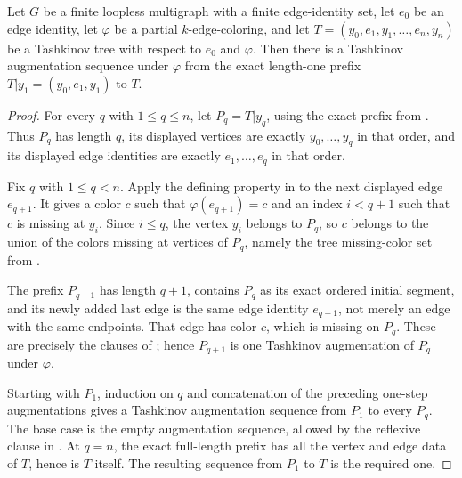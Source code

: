 \begin{lemma}
Let \(G\) be a finite loopless multigraph with a finite edge-identity set,
let \(e_0\) be an edge identity, let \(\varphi\) be a partial \(k\)-edge-coloring,
and let \(T=(y_0,e_1,y_1,\ldots,e_n,y_n)\) be a Tashkinov tree with
respect to \(e_0\) and \(\varphi\).  Then there is a Tashkinov augmentation
sequence under \(\varphi\) from the exact length-one prefix
\(T|y_1=(y_0,e_1,y_1)\) to \(T\).
\end{lemma}
\begin{proof}
For every \(q\) with \(1\leq q\leq n\), let \(P_q=T|y_q\), using the
exact prefix from .  Thus \(P_q\) has length
\(q\), its displayed vertices are exactly \(y_0,\ldots,y_q\) in that
order, and its displayed edge identities are exactly
\(e_1,\ldots,e_q\) in that order.

Fix \(q\) with \(1\leq q<n\).  Apply the defining property in
 to the next displayed edge \(e_{q+1}\).  It gives
a color \(c\) such that \(\varphi(e_{q+1})=c\) and an index
\(i<q+1\) such that \(c\) is missing at \(y_i\).  Since
\(i\leq q\), the vertex \(y_i\) belongs to \(P_q\), so \(c\) belongs to
the union of the colors missing at vertices of \(P_q\), namely the tree
missing-color set from .

The prefix \(P_{q+1}\) has length \(q+1\), contains \(P_q\) as its exact
ordered initial segment, and its newly added last edge is the same edge
identity \(e_{q+1}\), not merely an edge with the same endpoints.  That
edge has color \(c\), which is missing on \(P_q\).  These are precisely
the clauses of ; hence \(P_{q+1}\) is one
Tashkinov augmentation of \(P_q\) under \(\varphi\).

Starting with \(P_1\), induction on \(q\) and concatenation of the preceding
one-step augmentations gives a Tashkinov augmentation sequence from \(P_1\)
to every \(P_q\).  The base case is the empty augmentation sequence, allowed
by the reflexive clause in .  At
\(q=n\), the exact full-length prefix has all the vertex and edge data of
\(T\), hence is \(T\) itself.  The resulting sequence from \(P_1\) to \(T\)
is the required one.
\end{proof}
